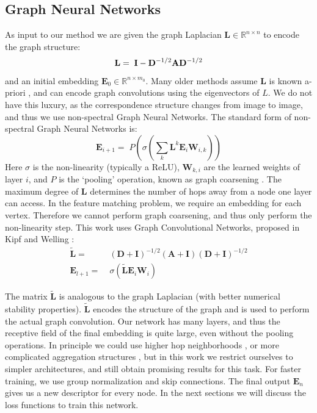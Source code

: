 \documentclass[10pt,twocolumn,letterpaper]{article}
\newcommand{\bR}{\mathbb{R}}
\newcommand{\mat}[1]{\mathbf{#1}}
\begin{document}
\subsection{Graph Neural Networks}
As input to our method we are given the graph Laplacian $\mat{L} \in \bR^{n \times n}$ to encode the graph structure:
\begin{equation}
  \mat{L} =\; \mat{I} - \mat{D}^{-1/2} \mat{A} \mat{D}^{-1/2} \\
\end{equation}
and an initial embedding $\mat{E}_0 \in \bR^{n \times m_0}$.
Many older methods assume $\mat{L}$ is known a-priori \cite{bruna2013spectral}, and can encode graph convolutions using the eigenvectors of $L$.
We do not have this luxury, as the correspondence structure changes from image to image, and thus we use non-spectral Graph Neural Networks.
The standard form of non-spectral Graph Neural Networks is:
\begin{equation}
\mat{E}_{i+1} =\; P\left(\sigma\left( \sum_k \mat{L}^k \mat{E}_i \mat{W}_{i,k} \right)\right)
\end{equation}
Here $\sigma$ is the non-linearity (typically a ReLU), $\mat{W}_{k,i}$ are the learned weights of layer $i$,  and $P$ is the `pooling' operation, known as graph coarsening \cite{bronstein2017geometric, gama2018mimo}.
The maximum degree of $\mat{L}$ determines the number of hops away from a node one layer can access.
In the feature matching problem, we require an embedding for each vertex.
Therefore we cannot perform graph coarsening, and thus only perform the non-linearity step.
This work uses Graph Convolutional Networks, proposed in Kipf and Welling \cite{kipf2016semi}:
\begin{align}
      \widetilde{\mat{L}} =&\; (\mat{D} + \mat{I})^{-1/2} (\mat{A} + \mat{I}) (\mat{D} + \mat{I})^{-1/2} \\
\mat{E}_{l+1} =&\; \sigma\left(\widetilde{\mat{L}} \mat{E}_i \mat{W}_i \right)  \label{eq:graph_conv}
\end{align}

The matrix $\widetilde{\mat{L}}$ is analogous to the graph Laplacian (with better numerical stability properties).
$\widetilde{\mat{L}}$ encodes the structure of the graph and is used to perform the actual graph convolution.
Our network has many layers, and thus the receptive field of the final embedding is quite large, even without the pooling operations.
In principle we could use higher hop neighborhoods \cite{gama2018convolutional}, or more complicated aggregation structures \cite{battaglia2018relational}, but in this work we restrict ourselves to simpler architectures, and still obtain promising results for this task.
For faster training, we use group normalization \cite{wu2018group} and skip connections.
The final output $\mat{E}_n$ gives us a new descriptor for every node.
In the next sections we will discuss the loss functions to train this network.
\end{document}
